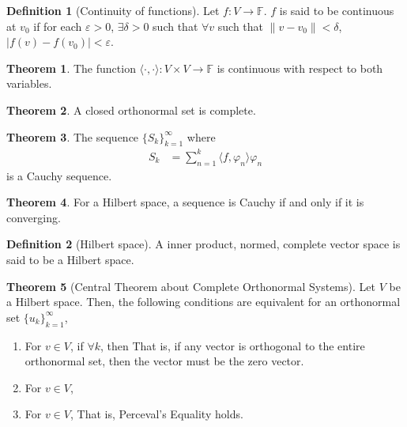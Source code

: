 \documentclass[fleqn, 8pt]{amsart}
\theoremstyle{definition}
\newtheorem{definition}{Definition}
\theoremstyle{theorem}
\newtheorem{theorem}{Theorem}
\begin{document}
\begin{multicols}{2}
\begin{spacing}{0.7}
\begin{definition}[Continuity of functions]
	Let $f : V \to \mathbb{F}$.
	$f$ is said to be continuous at $v_0$ if for each $\varepsilon > 0$, $\exists \delta > 0$ such that $\forall v$ such that $\|v - v_0\| < \delta$, $\left| f(v) - f(v_0) \right| < \varepsilon$.
\end{definition}

\begin{theorem}
	The function $\langle \cdot,\cdot \rangle : V \times V \to \mathbb{F}$ is continuous with respect to both variables.
\end{theorem}

\begin{theorem}
	A closed orthonormal set is complete.
\end{theorem}

\begin{theorem}
	The sequence $\{S_k\}_{k = 1}^{\infty}$ where
	\begin{align*}
		S_k &= \sum\limits_{n = 1}^{k} \langle f,\varphi_n \rangle \varphi_n
	\end{align*}
	is a Cauchy sequence.
\end{theorem}

\begin{theorem}
	For a Hilbert space, a sequence is Cauchy if and only if it is converging.
\end{theorem}

\begin{definition}[Hilbert space]
	A inner product, normed, complete vector space is said to be a Hilbert space.
\end{definition}

\begin{theorem}[Central Theorem about Complete Orthonormal Systems]
	Let $V$ be a Hilbert space.
	Then, the following conditions are equivalent for an orthonormal set $\{u_k\}_{k = 1}^{\infty}$,
	\begin{enumerate}
		\item
			For $v \in V$, if $\forall k$,
			then
			That is, if any vector is orthogonal to the entire orthonormal set, then the vector must be the zero vector.
		\item
			For $v \in V$,
		\item
			For $v \in V$,
			That is, Perceval's Equality holds.
	\end{enumerate}
\end{theorem}


\end{spacing}
\end{multicols}
\end{document}
